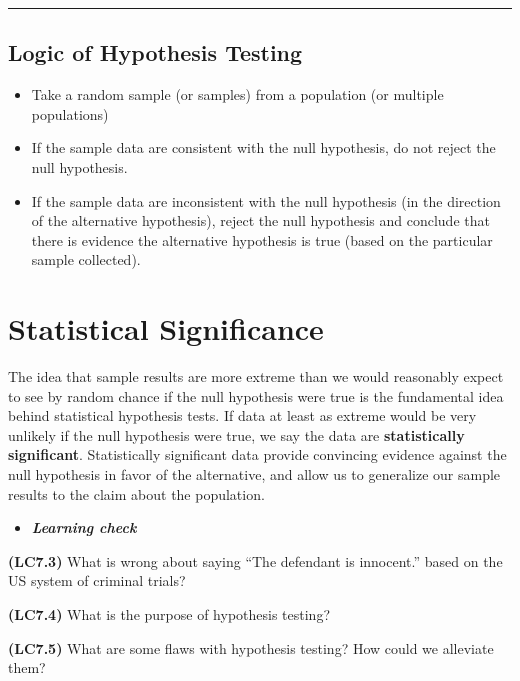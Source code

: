 \documentclass[]{tufte-book}
\let\oldrule=\rule
\renewcommand{\rule}[1]{\oldrule{\linewidth}}
\providecommand{\tightlist}{%
  \setlength{\itemsep}{0pt}\setlength{\parskip}{0pt}}
\newenvironment{rmdblock}[1]
  {\begin{shaded*}
  \begin{itemize}
  \renewcommand{\labelitemi}{
    \raisebox{-.7\height}[0pt][0pt]{
    }
  }
  \item
  }
  {
  \end{itemize}
  \end{shaded*}
  }
\newenvironment{learncheck}
  {\begin{rmdblock}{warning}}
  {\end{rmdblock}}
\begin{document}
\begin{center}\rule{0.5\linewidth}{\linethickness}\end{center}

\subsection{Logic of Hypothesis
Testing}\label{logic-of-hypothesis-testing}

\begin{itemize}
\tightlist
\item
  Take a random sample (or samples) from a population (or multiple
  populations)
\item
  If the sample data are consistent with the null hypothesis, do not
  reject the null hypothesis.
\item
  If the sample data are inconsistent with the null hypothesis (in the
  direction of the alternative hypothesis), reject the null hypothesis
  and conclude that there is evidence the alternative hypothesis is true
  (based on the particular sample collected).
\end{itemize}

\section{Statistical Significance}\label{statistical-significance}

The idea that sample results are more extreme than we would reasonably
expect to see by random chance if the null hypothesis were true is the
fundamental idea behind statistical hypothesis tests. If data at least
as extreme would be very unlikely if the null hypothesis were true, we
say the data are \textbf{statistically significant}. Statistically
significant data provide convincing evidence against the null hypothesis
in favor of the alternative, and allow us to generalize our sample
results to the claim about the population.

\begin{learncheck}
\textbf{\emph{Learning check}}
\end{learncheck}

\textbf{(LC7.3)} What is wrong about saying ``The defendant is
innocent.'' based on the US system of criminal trials?

\textbf{(LC7.4)} What is the purpose of hypothesis testing?

\textbf{(LC7.5)} What are some flaws with hypothesis testing? How could
we alleviate them?
\end{document}
